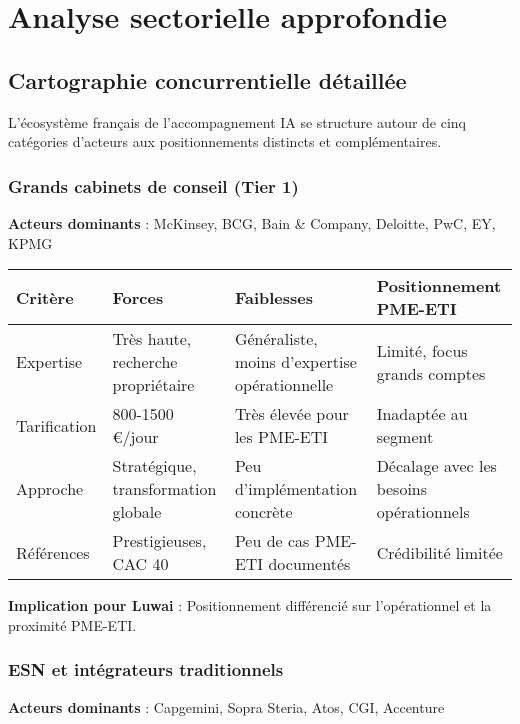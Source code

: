 \chapter{Analyse sectorielle approfondie}
\label{app:analyse}

\section{Cartographie concurrentielle détaillée}

L'écosystème français de l'accompagnement IA se structure autour de cinq catégories d'acteurs aux positionnements distincts et complémentaires.

\subsection{Grands cabinets de conseil (Tier 1)}

\textbf{Acteurs dominants} : McKinsey, BCG, Bain \& Company, Deloitte, PwC, EY, KPMG

\begin{longtable}{@{}p{3cm}p{4cm}p{4cm}p{4cm}@{}}
\toprule
\textbf{Critère} & \textbf{Forces} & \textbf{Faiblesses} & \textbf{Positionnement PME-ETI} \\
\midrule
Expertise & Très haute, recherche propriétaire & Généraliste, moins d'expertise opérationnelle & Limité, focus grands comptes \\
Tarification & 800-1500 €/jour & Très élevée pour les PME-ETI & Inadaptée au segment \\
Approche & Stratégique, transformation globale & Peu d'implémentation concrète & Décalage avec les besoins opérationnels \\
Références & Prestigieuses, CAC 40 & Peu de cas PME-ETI documentés & Crédibilité limitée \\
\bottomrule
\end{longtable}

\textbf{Implication pour Luwai} : Positionnement différencié sur l'opérationnel et la proximité PME-ETI.

\subsection{ESN et intégrateurs traditionnels}

\textbf{Acteurs dominants} : Capgemini, Sopra Steria, Atos, CGI, Accenture

